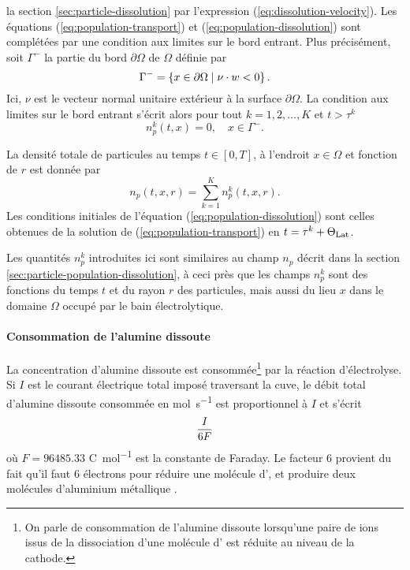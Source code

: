 la section \ref{sec:particle-dissolution} par l'expression
(\ref{eq:dissolution-velocity}). Les équations
(\ref{eq:population-transport}) et (\ref{eq:population-dissolution})
sont complétées par une condition aux limites sur le bord entrant. Plus
précisément, soit $\Gamma^-$ la partie du bord $\partial \Omega$ de $\Omega$
définie par
\begin{equation}\label{eq:np-bc}
  \Gamma^- = \left\{ x\in\partial\Omega \mid \nu \cdot  w
  < 0 \right\}.
\end{equation}
Ici, $\nu$ est le vecteur normal unitaire extérieur à la surface
$\partial \Omega$. La condition aux limites sur le bord entrant s'écrit
alors pour tout $k = 1, 2, \dots, K$ et $t > \tau^k$
\begin{equation}
n_p^k(t, x) = 0, \quad x\in\Gamma^-.
\end{equation}

La densité totale de particules au temps $t \in [0, T]$, à l'endroit
$x\in\Omega$ et fonction de $r$ est donnée par
\begin{equation}\label{eq:populations-sum}
  n_p(t, x, r) = \sum_{k=1}^K n_p^k(t, x, r).
\end{equation}
Les conditions initiales de l'équation
(\ref{eq:population-dissolution}) sont celles obtenues de la solution
de (\ref{eq:population-transport}) en $t = \tau^k + \Theta_\text{Lat}$.

\begin{remarque}
Les quantités $n_p^k$ introduites ici sont similaires au champ $n_p$
décrit dans la section \ref{sec:particle-population-dissolution}, à
ceci près que les champs $n_p^k$ sont des fonctions du temps $t$ et du
rayon $r$ des particules, mais aussi du lieu $x$ dans le domaine
$\Omega$ occupé par le bain électrolytique.
\end{remarque}

\paragraph{Consommation de l'alumine dissoute}
La concentration d'alumine dissoute est consommée\footnote{On parle de
consommation de l'alumine dissoute lorsqu'une paire de ions  issus de
la dissociation d'une molécule d' est réduite au niveau de
la cathode.} par la réaction
d'électrolyse. Si $I$ est le courant électrique total imposé
traversant la cuve, le débit total d'alumine dissoute consommée en
\si{\mol\per\second} est proportionnel à $I$ et s'écrit
\begin{equation}\label{eq:mass-consumption}
  \frac{I}{6F}
\end{equation}
où $F = \num{96485.33}$ \si{\coulomb\per\mol} est la constante de
Faraday. Le facteur \num{6} provient du fait qu'il
faut \num{6} électrons pour réduire une molécule d', et
produire deux molécules d'aluminium métallique .

